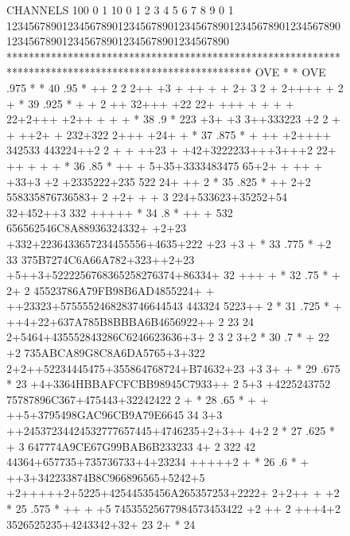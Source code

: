 \begin{figure}[p]
\begin{minipage}[t]{.495\textwidth}
\begin{XMPfrac}{3.3}
CHANNELS 100 0                                                                                                  1
          10 0        1         2         3         4         5         6         7         8         9         0
           1 1234567890123456789012345678901234567890123456789012345678901234567890123456789012345678901234567890
           ********************************************************************************************************
  OVE      *                                                                                                      * OVE
     .975  *                                                                                                      *  40
     .95   *                  ++   2   2 2++  +3 +   ++     +  +     2+         3 2  + 2++++       + 2    +       *  39
     .925  *           +   +    2  ++ 32+++ +22  22+    +++    +       + +    +  22+2+++ +2++   + + +             *  38
     .9    *                   223 +3+ +3 3++333223  +2  2     +  +    ++2+ +    232+322 2+++  +24+      +        *  37
     .875  *           +   ++ +2++++ 342533 443224++2 2  +   +  ++23  +  +42+3222233+++3+++2 22+ ++   + + +       *  36
     .85   *               ++  + 5+35+3333483475 65+2+ + ++  +    +33+3 +2 +2335222+235 522 24+   ++    2         *  35
     .825  *                ++  2+2 558335876736583+ 2 +2+ + +   3   224+533623+35252+54 32+452++3 332 +++++      *  34
     .8    *            ++   + 532 656562546C8A88936324332+ +2+23 +332+2236433657234455556+4635+222 +23 +3  +     *  33
     .775  *               +2  33 375B7274C6A66A782+323++2+23  +5++3+5222256768365258276374+86334+ 32    +++ +    *  32
     .75   *            + 2+ 2 45523786A79FB98B6AD4855224+  + ++23323+5755552468283746644543 443324 5223++  2     *  31
     .725  *            + ++4+22+637A785B8BBBA6B4656922++ 2 23 24 2+5464+435552843286C6246623636+3+ 2 3 2  3+2    *  30
     .7    *       +      22 +2 735ABCA89G8C8A6DA5765+3+322  2+2++52234445475+355864768724+B74632+23 +3   3+   +  *  29
     .675  *              23 +4+3364HBBAFCFCBB98945C7933++ 2 5+3 +4225243752 75787896C367+475443+32242422 2 +     *  28
     .65   *           + + ++5+3795498GAC96CB9A79E6645 34 3+3  ++24537234424532777657445+4746235+2+3++  4+2 2     *  27
     .625  *           +     3 647774A9CE67G99BAB6B233233 4+ 2 322 42 44364+657735+735736733+4+23234 +++++2  +    *  26
     .6    *            + ++3+342233874B8C966896565+5242+5 +2+++++2+5225+42544535456A265357253+2222+ 2+2++ +  +2  *  25
     .575  *           ++  +  +5 74535525677984573453422 +2   ++ 2  +++4+2 3526525235+4243342+32+  23 2+          *  24

\end{XMPfrac}
\end{minipage}
\end{figure}
